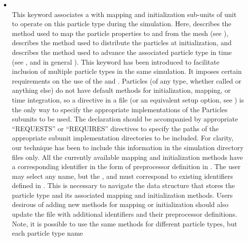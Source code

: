 \begin{itemize}
\item {}   
   
    \\ 
This keyword associates a  with mapping and  
initialization sub-units of  unit to operate on this 
particle type during the simulation.  Here,  
describes the method used to map the particle properties to and from 
the mesh (see ),
 describes the method used to
distribute the particles at initialization, and
 describes the method used to advance the
associated particle type in time (see ,
and in general ).
This keyword has been introduced to  facilitate inclusion of multiple
particle types in the same simulation. It imposes certain
requirements on the use of the  and
 \subunits.
Particles (of any type, whether called  or anything else)
do not have default methods for initialization, mapping, or time integration,
so a  directive in a
 file  (or an equivalent  setup
option, see ) is the only way to 
specify the appropriate implementations of the \unit{Particles} subunits to be 
used. The declaration should be accompanied by appropriate
``REQUESTS'' or ``REQUIRES'' directives to specify the paths of the
appropriate subunit implementation directories to be included. 
For clarity, our technique has been to include this 
information in the simulation directory  files only. All
the currently available mapping and initialization methods have a
corresponding identifier in the form of preprocessor definition in
. The user may select any 
name, but the , 
and  must correspond to existing
identifiers defined in . This is necessary to
navigate the data  structure that stores the particle type and its
associated mapping and initialization methods. Users desirous of
adding new methods for mapping or initialization should also update
the  file with additional identifiers and their
preprocessor definitions. Note, it is possible to use the   same
methods for different particle types, but each particle type   name

\end{itemize}
